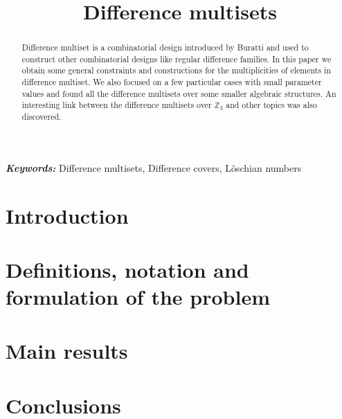 \documentclass{article}
\title{Difference multisets}
\date{}
\author{}
\theoremstyle{plain}
\theoremstyle{definition}
\theoremstyle{remark}
\providecommand{\keywords}[1]{\textbf{\textit{Keywords: }} #1}
\begin{document}
	\maketitle
	
	\begin{abstract}
		Difference multiset is a combinatorial design introduced by Buratti \cite{buratti1999old} and used to construct other combinatorial designs like regular difference families. In this paper we obtain some general constraints and constructions for the multiplicities of elements in difference multiset. We also focused on a few particular cases with small parameter values and found all the difference multisets over some smaller algebraic structures. An interesting link between the difference multisets over $\mathbb Z_3$ and other topics was also discovered.
	\end{abstract}
	
	\keywords{Difference multisets, Difference covers, Löschian numbers}
    
    \section{Introduction}
    
     
	\section{Definitions, notation and formulation of the problem}
    
	
    \section{Main results}
    

    \section{Conclusions}
    
	
	
	 
	
\end{document}
